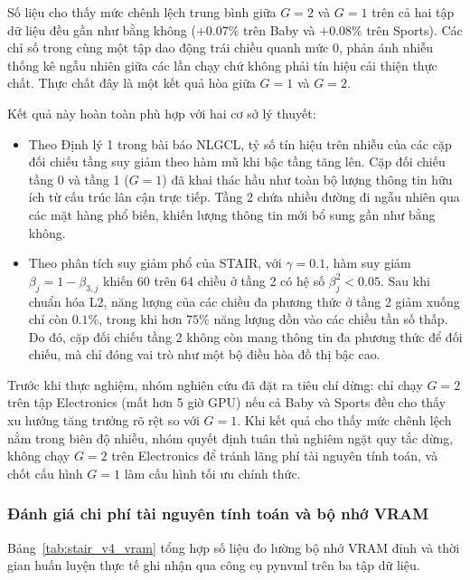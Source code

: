 Số liệu cho thấy mức chênh lệch trung bình giữa $G=2$ và $G=1$ trên cả hai tập dữ liệu đều gần như bằng không ($+0.07\%$ trên Baby và $+0.08\%$ trên Sports). Các chỉ số trong cùng một tập dao động trái chiều quanh mức 0, phản ánh nhiễu thống kê ngẫu nhiên giữa các lần chạy chứ không phải tín hiệu cải thiện thực chất. Thực chất đây là một kết quả hòa giữa $G=1$ và $G=2$.

Kết quả này hoàn toàn phù hợp với hai cơ sở lý thuyết:
\begin{itemize}
    \item Theo Định lý 1 trong bài báo NLGCL, tỷ số tín hiệu trên nhiễu của các cặp đối chiếu tầng suy giảm theo hàm mũ khi bậc tầng tăng lên. Cặp đối chiếu tầng 0 và tầng 1 ($G=1$) đã khai thác hầu như toàn bộ lượng thông tin hữu ích từ cấu trúc lân cận trực tiếp. Tầng 2 chứa nhiều đường đi ngẫu nhiên qua các mặt hàng phổ biến, khiến lượng thông tin mới bổ sung gần như bằng không.
    \item Theo phân tích suy giảm phổ của STAIR, với $\gamma = 0.1$, hàm suy giảm $\beta_j = 1 - \beta_{3, j}$ khiến 60 trên 64 chiều ở tầng 2 có hệ số $\beta_j^2 < 0.05$. Sau khi chuẩn hóa L2, năng lượng của các chiều đa phương thức ở tầng 2 giảm xuống chỉ còn $0.1\%$, trong khi hơn $75\%$ năng lượng dồn vào các chiều tần số thấp. Do đó, cặp đối chiếu tầng 2 không còn mang thông tin đa phương thức để đối chiếu, mà chỉ đóng vai trò như một bộ điều hòa đồ thị bậc cao.
\end{itemize}

Trước khi thực nghiệm, nhóm nghiên cứu đã đặt ra tiêu chí dừng: chỉ chạy $G=2$ trên tập Electronics (mất hơn 5 giờ GPU) nếu cả Baby và Sports đều cho thấy xu hướng tăng trưởng rõ rệt so với $G=1$. Khi kết quả cho thấy mức chênh lệch nằm trong biên độ nhiễu, nhóm quyết định tuân thủ nghiêm ngặt quy tắc dừng, không chạy $G=2$ trên Electronics để tránh lãng phí tài nguyên tính toán, và chốt cấu hình $G=1$ làm cấu hình tối ưu chính thức.

\subsubsection{Đánh giá chi phí tài nguyên tính toán và bộ nhớ VRAM}

Bảng~\ref{tab:stair_v4_vram} tổng hợp số liệu đo lường bộ nhớ VRAM đỉnh và thời gian huấn luyện thực tế ghi nhận qua công cụ pynvml trên ba tập dữ liệu.

